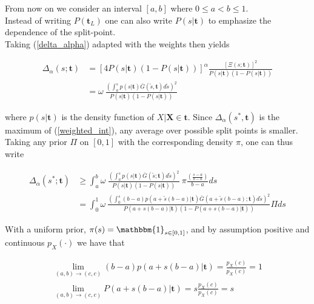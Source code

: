 \documentclass{article}
\begin{document}
From now on we consider an interval $[a, b]$ where $0 \leq a < b \leq 1$. \\
Instead of writing $P(\mathbf{t}_L)$ one can also write $P(s|\mathbf{t})$ to emphasize the dependence of the split-point. \\


Taking (\ref{delta_alpha}) adapted with the weights then yields

\begin{align}
    \Delta_{\alpha}(s; \mathbf{t}) &= [4 P(s|\mathbf{t}) (1 - P(s|\mathbf{t}))]^{\alpha} \frac{[\Xi(s; \mathbf{t})]^2} {P(s|\mathbf{t}) (1 - P(s|\mathbf{t}))} \nonumber \\
    &= \omega \
    \frac{(\int_{a}^{s} p(s|\mathbf{t}) \bar{G}(\tilde{s}, \mathbf{t}) d\tilde{s} )^2}{P(s|\mathbf{t}) (1 - P(s|\mathbf{t}))} \label{weighted_int}
\end{align}

where $p(s|\mathbf{t})$ is the density function of $X | \mathbf{X} \in \mathbf{t}$. Since $\Delta_{\alpha} (s^*, \mathbf{t})$ is the maximum of (\ref{weighted_int}), any average over possible split points is smaller. Taking any prior $\Pi$ on $[0, 1]$ with the corresponding density $\pi$, one can thus write

\begin{align}
    \Delta_{\alpha}(s^*; \mathbf{t}) &\geq \int_a^b \omega \ 
    \frac{(\int_{a}^{s} p(s|\mathbf{t}) \bar{G}(\tilde{s}; \mathbf{t}) d\tilde{s} )^2}{P(s|\mathbf{t})(1 - P(s|\mathbf{t}))} \ \pi \frac{\left (\frac{s-a}{b-a} \right )}{b-a} ds \nonumber \\
    &= \int_0^1 \omega \ \frac{(\int_0^s (b-a)p(a+\tilde{s} (b-a) | \mathbf{t}) \bar{G} (a+\tilde{s} (b-a) ; \mathbf{t}) d \tilde{s})^2}{P(a+s(b-a)|\mathbf{t}) (1- P(a+s(b-a)|\mathbf{t}))} \Pi ds \label{long_int}
\end{align}

With a uniform prior, $\pi (s) = \mathbbm{1}_{s \in [0, 1]}$, and by assumption positive and continuous $p_X(\cdot)$ we have that

\begin{align*}
    \lim_{(a,b) \rightarrow (c,c)} (b-a) p (a+s(b-a)|\mathbf{t}) = \frac{p_X(c)}{p_X(c)} = 1 \\
    \lim_{(a,b) \rightarrow (c,c)} P (a+s(b-a)|\mathbf{t}) = s \frac{p_X(c)}{p_X(c)} = s
\end{align*}

\end{document}
